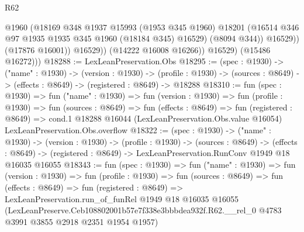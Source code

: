 \begin{lexlean}{R62}
\begin{coremodule}
                      @1960
                      (@18169
                        @348
                        @1937
                        @15993
                        (@1953 @345 @1960)
                        @18201
                        (@16514 @346 @97 @1935 @1935 @345 @1960 (@18184 @345) @16529)
                        (@8094 @344))
                      @16529))
                  (@17876 @16001))
                @16529))
            (@14222 @16008 @16266))
          @16529)
        (@15486 @16272)))
@18288 := LexLeanPreservation.Obs
@18295 := (spec : @1930) ->
  ("name" : @1930) ->
  (version : @1930) ->
  (profile : @1930) -> (sources : @8649) -> (effects : @8649) -> (registered : @8649) -> @18288
@18310 := fun (spec : @1930) =>
  fun ("name" : @1930) =>
  fun (version : @1930) =>
  fun (profile : @1930) =>
  fun (sources : @8649) =>
  fun (effects : @8649) =>
  fun (registered : @8649) =>
  cond.{1} @18288 @16044 (LexLeanPreservation.Obs.value @16054) LexLeanPreservation.Obs.overflow
@18322 := (spec : @1930) ->
  ("name" : @1930) ->
  (version : @1930) ->
  (profile : @1930) ->
  (sources : @8649) ->
  (effects : @8649) -> (registered : @8649) -> LexLeanPreservation.RunConv @1949 @18 @16035 @16055
@18343 := fun (spec : @1930) =>
  fun ("name" : @1930) =>
  fun (version : @1930) =>
  fun (profile : @1930) =>
  fun (sources : @8649) =>
  fun (effects : @8649) =>
  fun (registered : @8649) =>
  LexLeanPreservation.run_of_funRel
    @1949
    @18
    @16035
    @16055
    (LexLeanPreserve.Ceb108802001b57e7f338e3bbbdea932f.R62.__rel_0
      @4783
      @3991
      @3855
      @2918
      @2351
      @1954
      @1957)
\end{coremodule}
\end{lexlean}
